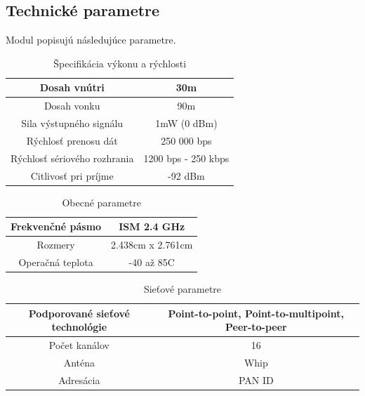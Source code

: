 \documentclass[11pt,twoside,a4paper]{book}
\begin{document}
\subsection{Technické parametre}
Modul popisujú následujúce parametre\cite{XBee}.

\begin{table}[htbp]
\begin{center}
\begin{tabular}{|c|c|}
\hline Dosah vnútri & 30m \\ 
\hline Dosah vonku & 90m \\ 
\hline Sila výstupného signálu & 1mW (0 dBm) \\
\hline Rýchlosť prenosu dát & 250 000 bps \\ 
\hline Rýchlosť sériového rozhrania & 1200 bps - 250 kbps \\ 
\hline Citlivosť pri príjme & -92 dBm \\
\hline 
\end{tabular} 
\end{center}
\caption{Špecifikácia výkonu a rýchlosti}
\label{tab:tab1}
\end{table}

\begin{table}[htbp]
\begin{center}
\begin{tabular}{|c|c|}
\hline Frekvenčné pásmo & ISM 2.4 GHz \\ 
\hline Rozmery & 2.438cm x 2.761cm \\ 
\hline Operačná teplota & -40 až 85C \\ 
\hline 
\end{tabular} 
\end{center}
\caption{Obecné parametre}
\label{tab:tab2}
\end{table}

\begin{table}[htbp]
\begin{center}
\begin{tabular}{|c|c|}
\hline Podporované sieťové technológie & Point-to-point, Point-to-multipoint, Peer-to-peer \\ 
\hline Počet kanálov & 16 \\ 
\hline Anténa & Whip \\
\hline Adresácia & PAN ID \\ 
\hline 
\end{tabular}
\end{center}
\caption{Sieťové parametre}
\label{tab:tab2}
\end{table}
\end{document}

